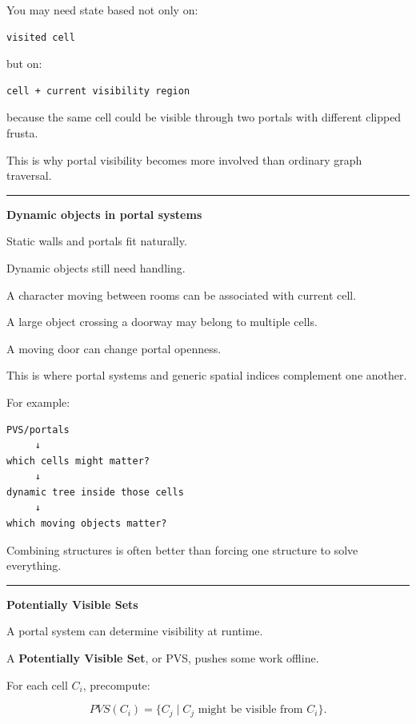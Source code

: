 You may need state based not only on:

\begin{verbatim}
visited cell
\end{verbatim}

but on:

\begin{verbatim}
cell + current visibility region
\end{verbatim}

because the same cell could be visible through two portals with different clipped frusta.

This is why portal visibility becomes more involved than ordinary graph traversal.

\begin{center}\rule{0.5\linewidth}{0.5pt}\end{center}

\textbf{Dynamic objects in portal systems}

Static walls and portals fit naturally.

Dynamic objects still need handling.

A character moving between rooms can be associated with current cell.

A large object crossing a doorway may belong to multiple cells.

A moving door can change portal openness.

This is where portal systems and generic spatial indices complement one another.

For example:

\begin{verbatim}
PVS/portals
     ↓
which cells might matter?
     ↓
dynamic tree inside those cells
     ↓
which moving objects matter?
\end{verbatim}

Combining structures is often better than forcing one structure to solve everything.

\begin{center}\rule{0.5\linewidth}{0.5pt}\end{center}

\textbf{Potentially Visible Sets}

A portal system can determine visibility at runtime.

A \textbf{Potentially Visible Set}, or PVS, pushes some work offline.

For each cell \(C_i\), precompute:

\[
PVS(C_i)
=
\{
C_j
\mid
C_j
\text{ might be visible from }C_i
\}.
\]

